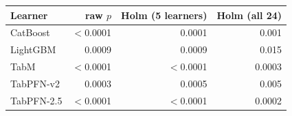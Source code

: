 \begin{tabular}{lrrr}
\toprule
Learner & raw $p$ & Holm (5 learners) & Holm (all 24) \\
\midrule
CatBoost & $<$0.0001 & 0.0001 & 0.001 \\
LightGBM & 0.0009 & 0.0009 & 0.015 \\
TabM & $<$0.0001 & $<$0.0001 & 0.0003 \\
TabPFN-v2 & 0.0003 & 0.0005 & 0.005 \\
TabPFN-2.5 & $<$0.0001 & $<$0.0001 & 0.0002 \\
\bottomrule
\end{tabular}

